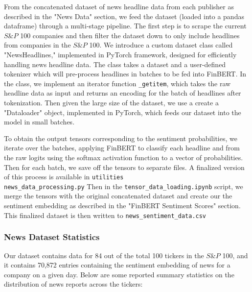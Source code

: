 From the concatenated dataset of news headline data from each publisher as described in the "News Data" section, we feed the dataset (loaded into a pandas dataframe) through a multi-stage pipeline. 
The first step is to scrape the current $S\&P$ 100 companies and then filter the dataset down to only include headlines from companies in the $S\&P$ 100. 
We introduce a custom dataset class called "NewsHeadlines," implemented in PyTorch framework, designed for efficiently handling news headline data. 
The class takes a dataset and a user-defined tokenizer which will pre-process headlines in batches to be fed into FinBERT. 
In the class, we implement an iterator function \texttt{\_getitem}, which takes the raw headline data as input and returns an encoding for the batch of headlines after tokenization. 
Then given the large size of the dataset, we use a create a "Dataloader" object, implemented in PyTorch, which feeds our dataset into the model in small batches. 

To obtain the output tensors corresponding to the sentiment probabilities, we iterate over the batches, applying FinBERT to classify each headline and from the raw logits using the softmax activation function to a vector of probabilities.
Then for each batch, we save off the tensors to separate files. A finalized version of this process is available in \texttt{utilities\\news\_data\_processing.py}
Then in the \texttt{tensor\_data\_loading.ipynb} script, we merge the tensors with the original concatenated dataset and create our the sentiment embedding as described in the "FinBERT Sentiment Scores" section. 
This finalized dataset is then written to \texttt{news\_sentiment\_data.csv}

\subsubsection{News Dataset Statistics}\label{newsstats}

Our dataset contains data for 84 out of the total 100 tickers in the $S\&P$ 100, and it contains 70,872 entries containing the sentiment embedding of news for a company on a given day. Below are some reported summary statistics on the distribution of news reports across the tickers:


